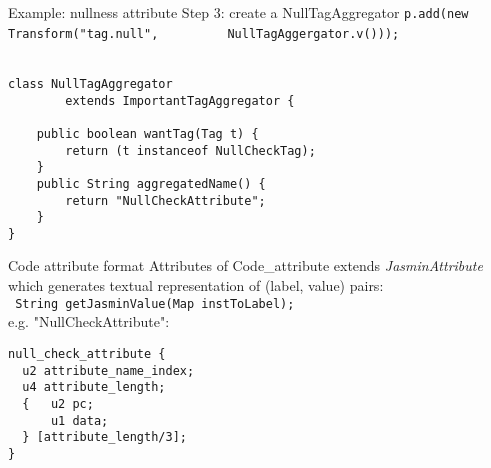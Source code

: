 \begin{slide}{Example: nullness attribute}
Step 3: create a NullTagAggregator
{\scriptsize\verb$p.add(new Transform("tag.null",$
   \verb$         NullTagAggergator.v())); $}
\ \\
\ \\
{\scriptsize
\begin{verbatim}
class NullTagAggregator
        extends ImportantTagAggregator {

    public boolean wantTag(Tag t) {
        return (t instanceof NullCheckTag);
    }
    public String aggregatedName() {
        return "NullCheckAttribute"; 
    }
}
\end{verbatim}
}
\end{slide}

\begin{slide}{Code attribute format}
Attributes of Code\_attribute extends {\em JasminAttribute}
which generates textual representation of (label, value)
pairs:\\
\footnotesize{\verb$ String getJasminValue(Map instToLabel); $} \\
e.g. "NullCheckAttribute":
\footnotesize{
\begin{verbatim}
null_check_attribute {
  u2 attribute_name_index;
  u4 attribute_length;
  {   u2 pc;
      u1 data;
  } [attribute_length/3];
}
\end{verbatim}
}
\end{slide}
